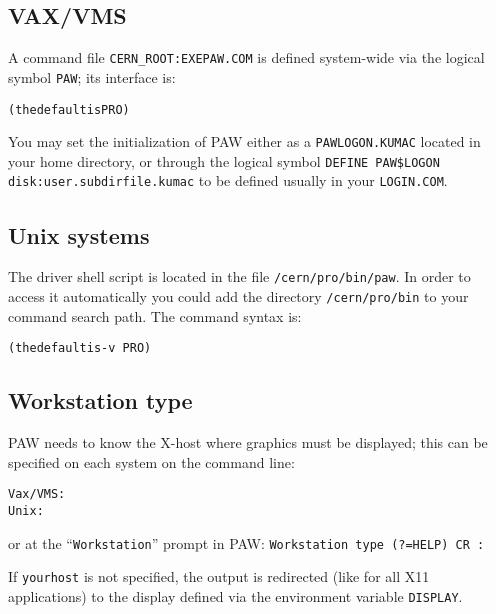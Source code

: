 \subsection{VAX/VMS}
 
A command file \texttt{CERN_ROOT:\lsb EXE\rsb PAW.COM}
is defined system-wide via the logical
symbol \texttt{PAW}; its interface is:

\begin{alltt}
      \rmfamily\qquad(the default is \texttt{PRO})
\end{alltt}

You may set the initialization of PAW either as a \texttt{PAWLOGON.KUMAC}
located in your home directory, or through the
logical symbol \texttt{DEFINE PAW\$LOGON disk:\lsb user.subdir\rsb file.kumac}
to be defined usually in your \texttt{LOGIN.COM}.

\subsection{Unix systems}
 
The driver shell script is located in the file
\texttt{/cern/pro/bin/paw}.
In order to access it automatically you could add the
directory \texttt{/cern/pro/bin} to your command search path.
%
%
%
%
%
%
%
%
%
%
%
The command syntax is:
\begin{alltt}
      \rmfamily\qquad(the default is \texttt{-v PRO})
\end{alltt}

\subsection{Workstation type}
 
PAW needs to know the X-host where graphics must be
displayed; this can be specified on each system on the command line:
\begin{alltt}
      Vax/VMS:   
      Unix:      
\end{alltt}
or at the ``\texttt{Workstation}'' prompt in PAW:
\texttt{Workstation type (?=HELP) \lsb CR : }
 
If \texttt{yourhost} is not specified, the output is redirected (like for all
X11 applications) to the display defined via the environment variable 
{\tt DISPLAY}.

